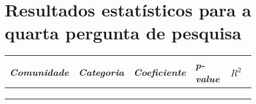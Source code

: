 \chapter{Resultados estatísticos para a quarta pergunta de pesquisa}
\label{app:q4}

\small
\begin{longtabu}{@{}
	p{0.2\linewidth}
	p{0.2\linewidth}
	P{0.15\linewidth}
	P{0.15\linewidth}
	P{0.13\linewidth}@{}}
\toprule
\textit{Comunidade}        & \textit{Categoria}    & \textit{Coeficiente} & \textit{p-value} & $R^2$ \\ \midrule
\endhead

\\ \hline
\endfoot

\\
\endlastfoot


\end{longtabu}

